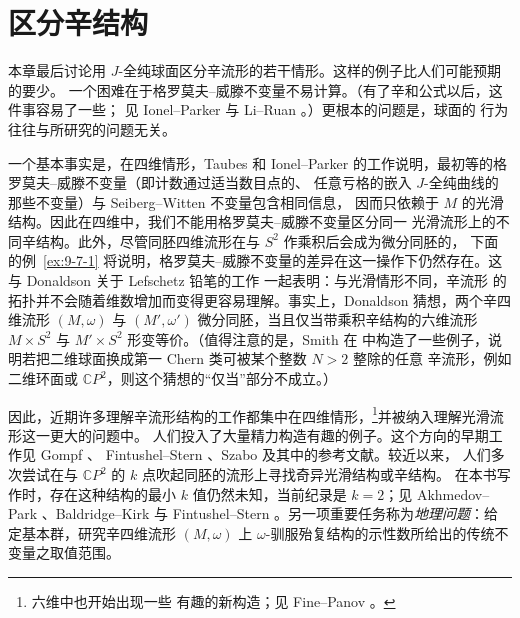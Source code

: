 
\section{区分辛结构}\label{sec:9-7}

本章最后讨论用 $J$-全纯球面区分辛流形的若干情形。这样的例子比人们可能预期的要少。
一个困难在于格罗莫夫--威滕不变量不易计算。（有了辛和公式以后，这件事容易了一些；
见 Ionel--Parker  与 Li--Ruan 。）更根本的问题是，球面的
行为往往与所研究的问题无关。

一个基本事实是，在四维情形，Taubes  和 Ionel--Parker
 的工作说明，最初等的格罗莫夫--威滕不变量（即计数通过适当数目点的、
任意亏格的嵌入 $J$-全纯曲线的那些不变量）与 Seiberg--Witten 不变量包含相同信息，
因而只依赖于 $M$ 的光滑结构。因此在四维中，我们不能用格罗莫夫--威滕不变量区分同一
光滑流形上的不同辛结构。此外，尽管同胚四维流形在与 $S^2$ 作乘积后会成为微分同胚的，
下面的例~\ref{ex:9-7-1} 将说明，格罗莫夫--威滕不变量的差异在这一操作下仍然存在。这与
Donaldson 关于 Lefschetz 铅笔的工作  一起表明：与光滑情形不同，辛流形
的拓扑并不会随着维数增加而变得更容易理解。事实上，Donaldson 猜想，两个辛四维流形
$(M,\omega)$ 与 $(M',\omega')$ 微分同胚，当且仅当带乘积辛结构的六维流形
$M\times S^2$ 与 $M'\times S^2$ 形变等价。（值得注意的是，Smith 在 
中构造了一些例子，说明若把二维球面换成第一 Chern 类可被某个整数 $N>2$ 整除的任意
辛流形，例如二维环面或 $\mathbb CP^2$，则这个猜想的“仅当”部分不成立。）

因此，近期许多理解辛流形结构的工作都集中在四维情形，\footnote{六维中也开始出现一些
有趣的新构造；见 Fine--Panov 。}并被纳入理解光滑流形这一更大的问题中。
人们投入了大量精力构造有趣的例子。这个方向的早期工作见 Gompf 、
Fintushel--Stern 、Szabo  及其中的参考文献。较近以来，
人们多次尝试在与 $\mathbb CP^2$ 的 $k$ 点吹起同胚的流形上寻找奇异光滑结构或辛结构。
在本书写作时，存在这种结构的最小 $k$ 值仍然未知，当前纪录是 $k=2$；见
Akhmedov--Park 、Baldridge--Kirk  与 Fintushel--Stern
。另一项重要任务称为\emph{地理问题}：给定基本群，研究辛四维流形
$(M,\omega)$ 上 $\omega$-驯服殆复结构的示性数所给出的传统不变量之取值范围。

